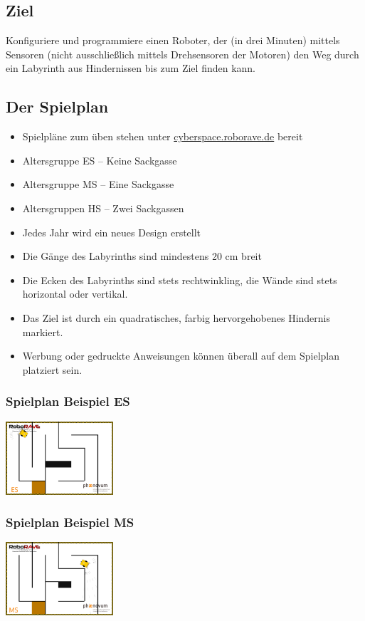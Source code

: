 \documentclass[a4paper,12pt]{article}
\begin{document}
\subsection{Ziel}

Konfiguriere und programmiere einen Roboter, der (in drei Minuten) mittels
Sensoren (nicht ausschließlich mittels Drehsensoren der Motoren) den Weg
durch ein Labyrinth aus Hindernissen bis zum Ziel finden kann.

\subsection{Der Spielplan}

\begin{itemize}
	\item Spielpläne zum üben stehen unter
\href{https://www.cyberspace.roborave.de/lab/}{cyberspace.roborave.de} bereit
	\item Altersgruppe ES – Keine Sackgasse
	\item Altersgruppe MS – Eine Sackgasse
	\item Altersgruppen HS – Zwei Sackgassen
	\item Jedes Jahr wird ein neues Design erstellt
	\item Die Gänge des Labyrinths sind mindestens 20 cm breit
	\item Die Ecken des Labyrinths sind stets rechtwinkling, die Wände sind
		stets horizontal oder vertikal.
	\item Das Ziel ist durch ein quadratisches, farbig hervorgehobenes
		Hindernis markiert.
	\item Werbung oder gedruckte Anweisungen können überall
		auf dem Spielplan platziert sein.
\end{itemize}

\subsubsection{Spielplan Beispiel ES}
\includegraphics[width=0.3\textwidth]{images/cyberspace/labyrinth_es.png}

\subsubsection{Spielplan Beispiel MS}
\includegraphics[width=0.3\textwidth]{images/cyberspace/labyrinth_ms.png}
\end{document}
